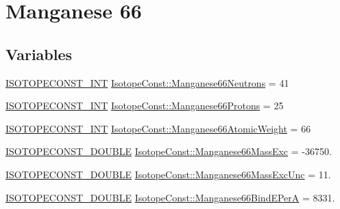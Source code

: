 \hypertarget{group___isotope_const-_manganese-_mn66}{}\section{Manganese 66}
\label{group___isotope_const-_manganese-_mn66}
\subsection*{Variables}
\begin{DoxyCompactItemize}
\item 
\mbox{\hyperlink{group___isotope_const-_macros_ga5f18360b3e99483a35c32d789e62621c}{I\+S\+O\+T\+O\+P\+E\+C\+O\+N\+S\+T\+\_\+\+I\+NT}} \mbox{\hyperlink{group___isotope_const-_manganese-_mn66_gaa457d1e2614e8c34765675ae93084ec8}{Isotope\+Const\+::\+Manganese66\+Neutrons}} = 41
\item 
\mbox{\hyperlink{group___isotope_const-_macros_ga5f18360b3e99483a35c32d789e62621c}{I\+S\+O\+T\+O\+P\+E\+C\+O\+N\+S\+T\+\_\+\+I\+NT}} \mbox{\hyperlink{group___isotope_const-_manganese-_mn66_ga59be2ac63a4f5bd6c90a67d76b6430f9}{Isotope\+Const\+::\+Manganese66\+Protons}} = 25
\item 
\mbox{\hyperlink{group___isotope_const-_macros_ga5f18360b3e99483a35c32d789e62621c}{I\+S\+O\+T\+O\+P\+E\+C\+O\+N\+S\+T\+\_\+\+I\+NT}} \mbox{\hyperlink{group___isotope_const-_manganese-_mn66_gab43bf5e3e339155af45b798cebc8571d}{Isotope\+Const\+::\+Manganese66\+Atomic\+Weight}} = 66
\item 
\mbox{\hyperlink{group___isotope_const-_macros_ga8f45a7272ce02c0b4c65c44636ed719a}{I\+S\+O\+T\+O\+P\+E\+C\+O\+N\+S\+T\+\_\+\+D\+O\+U\+B\+LE}} \mbox{\hyperlink{group___isotope_const-_manganese-_mn66_gabe41d69acda493d83656754811eb9b35}{Isotope\+Const\+::\+Manganese66\+Mass\+Exc}} = -\/36750.
\item 
\mbox{\hyperlink{group___isotope_const-_macros_ga8f45a7272ce02c0b4c65c44636ed719a}{I\+S\+O\+T\+O\+P\+E\+C\+O\+N\+S\+T\+\_\+\+D\+O\+U\+B\+LE}} \mbox{\hyperlink{group___isotope_const-_manganese-_mn66_ga94078427c8d0b17620f0ad4d88aa06e1}{Isotope\+Const\+::\+Manganese66\+Mass\+Exc\+Unc}} = 11.
\item 
\mbox{\hyperlink{group___isotope_const-_macros_ga8f45a7272ce02c0b4c65c44636ed719a}{I\+S\+O\+T\+O\+P\+E\+C\+O\+N\+S\+T\+\_\+\+D\+O\+U\+B\+LE}} \mbox{\hyperlink{group___isotope_const-_manganese-_mn66_ga79d3ca61065e39b68a6835e64c6a9a07}{Isotope\+Const\+::\+Manganese66\+Bind\+E\+PerA}} = 8331.
\item 

\end{DoxyCompactItemize}
